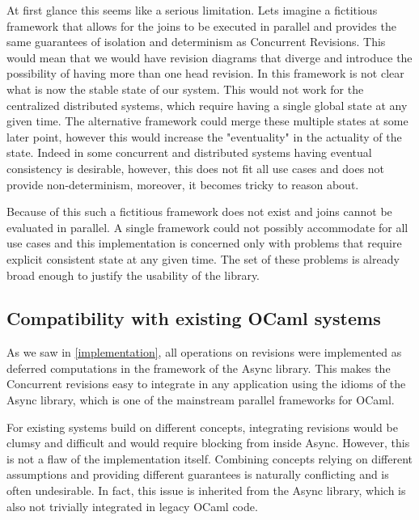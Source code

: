 \documentclass[12pt,twoside,notitlepage]{report}
\begin{document}
At first glance this seems like a  serious limitation. Lets imagine a fictitious framework that allows for the joins to be executed in parallel and provides the same guarantees of isolation and determinism as Concurrent Revisions. This would mean that we would have revision diagrams that diverge and introduce the possibility of having more than one head revision. In this framework is not clear what is now the stable state of our system. This would not work for the centralized distributed systems, which require having a single global state at any given time. The alternative framework could merge these multiple states at some later point, however this would increase the "eventuality" in the actuality of the state. Indeed in some concurrent and distributed systems having eventual consistency is desirable\cite{bacon}, however, this does not fit all use cases and does not provide non-determinism, moreover, it becomes tricky to reason about.

Because of this such a fictitious framework does not exist and joins cannot be evaluated in parallel. A single framework could not possibly accommodate for all use cases and this implementation is concerned only with problems that require explicit consistent state at any given time. The set of these problems is already broad enough to justify the usability of the library.      

\subsection{Compatibility with existing OCaml systems}
As we saw in \ref{implementation}, all operations on revisions were implemented as deferred computations in the framework of the Async library. This makes the Concurrent revisions easy to integrate in any application using the idioms of the Async library, which is one of the mainstream parallel frameworks for OCaml.

For existing systems build on different concepts, integrating revisions would be clumsy and difficult and would require blocking from inside Async. However, this is not a flaw of the implementation itself. Combining concepts relying on different assumptions and providing different guarantees is naturally conflicting and is often undesirable. In fact, this issue is inherited from the Async library, which is also not trivially integrated in legacy OCaml code. 
\end{document}
